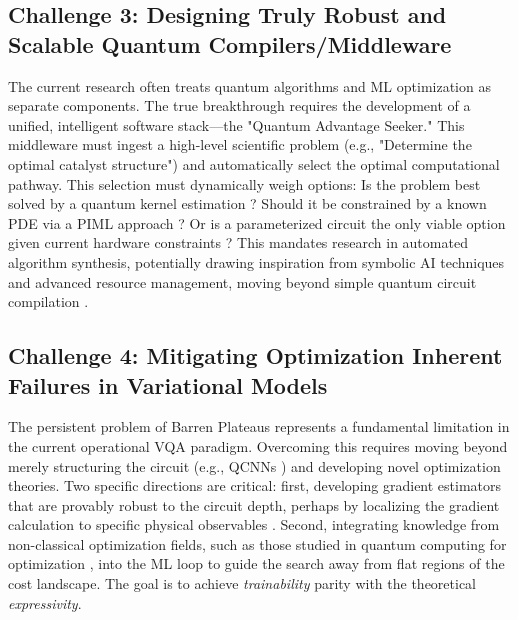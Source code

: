 \documentclass{article}
\begin{document}
\subsection{Challenge 3: Designing Truly Robust and Scalable Quantum Compilers/Middleware}

\label{sec:challenge_3\_designing\_truly\_robust\_and\_s}

The current research often treats quantum algorithms and ML optimization as separate components. The true breakthrough requires the development of a unified, intelligent software stack---the "Quantum Advantage Seeker." This middleware must ingest a high-level scientific problem (e.g., "Determine the optimal catalyst structure") and automatically select the optimal computational pathway. This selection must dynamically weigh options: Is the problem best solved by a quantum kernel estimation \cite{jager2023universal}? Should it be constrained by a known PDE via a PIML approach \cite{karniadakis2021physicsinformed}? Or is a parameterized circuit the only viable option given current hardware constraints \cite{cerezo2021variational}? This mandates research in automated algorithm synthesis, potentially drawing inspiration from symbolic AI techniques and advanced resource management, moving beyond simple quantum circuit compilation \cite{araujo2021divideandconquer}.

\subsection{Challenge 4: Mitigating Optimization Inherent Failures in Variational Models}

\label{sec:challenge_4\_mitigating\_optimization\_inhe}

The persistent problem of Barren Plateaus represents a fundamental limitation in the current operational VQA paradigm. Overcoming this requires moving beyond merely structuring the circuit (e.g., QCNNs \cite{goto2021universal}) and developing novel optimization theories. Two specific directions are critical: first, developing gradient estimators that are provably robust to the circuit depth, perhaps by localizing the gradient calculation to specific physical observables \cite{kiani2022quantum}. Second, integrating knowledge from non-classical optimization fields, such as those studied in quantum computing for optimization \cite{sankar2024benchmarking}, into the ML loop to guide the search away from flat regions of the cost landscape. The goal is to achieve \textit{trainability} parity with the theoretical \textit{expressivity}.
\end{document}
